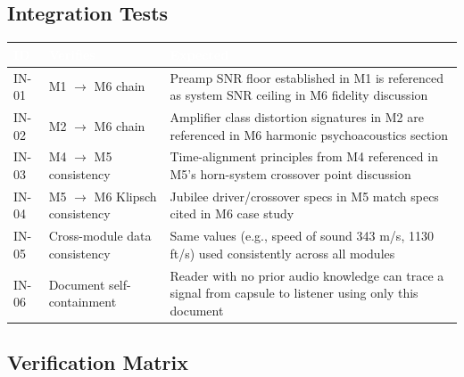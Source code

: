 \documentclass[11pt,letterpaper]{article}
\newcommand{\tableheader}[1]{\textbf{\sffamily\textcolor{white}{#1}}}
\begin{document}
\subsection{Integration Tests}

\begin{center}
\begin{tabularx}{\textwidth}{L{1.5cm}L{4cm}X}
\toprule
{}
\tableheader{ID} & \tableheader{Verifies} & \tableheader{Expected} \\
\midrule
IN-01 & M1 $\to$ M6 chain & Preamp SNR floor established in M1 is referenced as system SNR ceiling in M6 fidelity discussion \\
IN-02 & M2 $\to$ M6 chain & Amplifier class distortion signatures in M2 are referenced in M6 harmonic psychoacoustics section \\
IN-03 & M4 $\to$ M5 consistency & Time-alignment principles from M4 referenced in M5's horn-system crossover point discussion \\
IN-04 & M5 $\to$ M6 Klipsch consistency & Jubilee driver/crossover specs in M5 match specs cited in M6 case study \\
IN-05 & Cross-module data consistency & Same values (e.g., speed of sound 343 m/s, 1130 ft/s) used consistently across all modules \\
IN-06 & Document self-containment & Reader with no prior audio knowledge can trace a signal from capsule to listener using only this document \\
\bottomrule
\end{tabularx}
\end{center}

\subsection{Verification Matrix}
\end{document}
